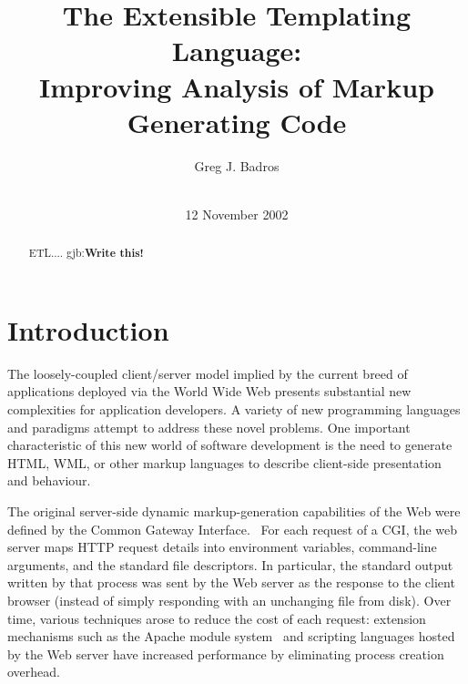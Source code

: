 \documentclass{www2003-submission}
\newcommand{\B}{\discretionary{}{}{}}
\newcommand{\gjb}[1]{{\sc gjb:}\textbf{#1}}
\begin{document}
%
\title{The Extensible Templating Language: \\
       Improving Analysis of Markup Generating Code}


\author{
%
\alignauthor Greg J. Badros\\
       \\
}
\date{12 November 2002}
\maketitle
\begin{abstract}
ETL.... \gjb{Write this!}

\end{abstract}




\section{Introduction}
\label{sec-intro}

The loosely-coupled client/\B{}server model implied by the current
breed of applications deployed via the World Wide Web presents
substantial new complexities for application developers. A variety of
new programming languages and paradigms attempt to address these novel
problems.  One important characteristic of this new world of software
development is the need to generate HTML, WML, or other markup
languages to describe client-side presentation and behaviour.

The original server-side dynamic markup-generation capabilities of the
Web were defined by the Common Gateway Interface.~\cite{CGI11} For each
request of a CGI, the web server maps HTTP request details into environment
variables, command-line arguments, and the standard file descriptors.
In particular, the standard output written by that process was sent by
the Web server as the response to the client browser (instead of
simply responding with an unchanging file from disk).  Over time,
various techniques arose to reduce the cost of each request: extension
mechanisms such as the Apache module system~\cite{Apache} and
scripting languages hosted by the Web server have increased
performance by eliminating process creation overhead.
\end{document}
